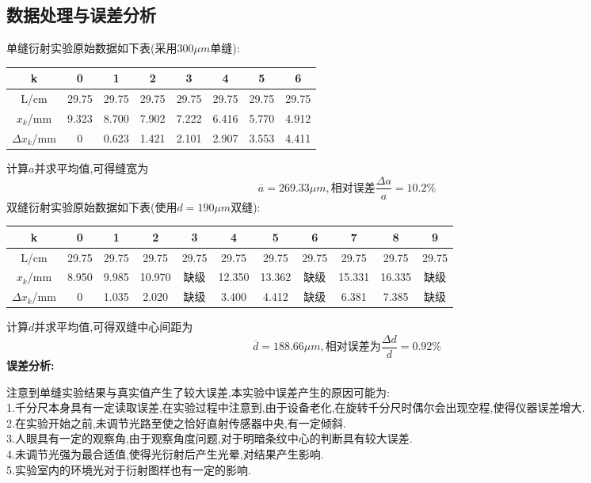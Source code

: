 \documentclass[12pt,a4paper,oneside]{ctexart}
\begin{document}
\subsection*{数据处理与误差分析}
单缝衍射实验原始数据如下表(采用300$\mu m$单缝):
\begin{center}
    \begin{tabular}{|c|c|c|c|c|c|c|c|}
    \hline
    k&0&1&2&3&4&5&6\\
    \hline
    L/cm& 29.75& 29.75 & 29.75 & 29.75 & 29.75 & 29.75&29.75\\
    \hline
    $x_k$/mm&9.323&8.700&7.902&7.222&6.416&5.770&4.912\\
    \hline    
    $\Delta x_k$/mm&0&0.623&1.421&2.101&2.907&3.553&4.411\\
    \hline   
    \end{tabular}
\end{center}
计算$a$并求平均值,可得缝宽为
$$\overline{a}=269.33\mu m,\mbox{相对误差}\frac{\Delta a}{a}=10.2\%$$
双缝衍射实验原始数据如下表(使用$d=190\mu m$双缝):
\begin{center}
    \begin{tabular}{|c|c|c|c|c|c|c|c|c|c|c|}
    \hline
    k&0&1&2&3&4&5&6&7&8&9\\
    \hline
    L/cm& 29.75& 29.75 & 29.75 & 29.75 & 29.75 & 29.75&29.75&29.75&29.75&29.75\\
    \hline
    $x_k$/mm&8.950&9.985&10.970&缺级&12.350&13.362&缺级&15.331&16.335&缺级\\
    \hline    
    $\Delta x_k$/mm&0&1.035&2.020&缺级&3.400&4.412&缺级&6.381&7.385&缺级\\
    \hline   
    \end{tabular}
\end{center}
计算$d$并求平均值,可得双缝中心间距为
$$\overline{d}=188.66\mu m,\mbox{相对误差为}\frac{\Delta d}{d}=0.92\%$$
\textbf{误差分析:}\par
注意到单缝实验结果与真实值产生了较大误差,本实验中误差产生的原因可能为:\\
1.千分尺本身具有一定读取误差,在实验过程中注意到,由于设备老化,在旋转千分尺时偶尔会出现空程,使得仪器误差增大.\\
2.在实验开始之前,未调节光路至使之恰好直射传感器中央,有一定倾斜.\\
3.人眼具有一定的观察角,由于观察角度问题,对于明暗条纹中心的判断具有较大误差.\\
4.未调节光强为最合适值,使得光衍射后产生光晕,对结果产生影响.\\
5.实验室内的环境光对于衍射图样也有一定的影响.
\end{document}
